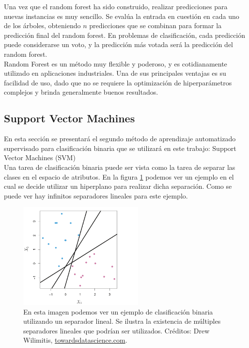 Una vez que el random forest ha sido construido, realizar predicciones para nuevas instancias es muy sencillo. Se evalúa la entrada en cuestión en cada uno de los árboles, obteniendo $n$ predicciones que se combinan para formar la predicción final del random forest. En problemas de clasificación, cada predicción puede considerarse un voto, y la predicción más votada será la predicción del random forest.\\

Random Forest es un método muy flexible y poderoso, y es cotidianamente utilizado en aplicaciones industriales. Una de sus principales ventajas es su facilidad de uso, dado que no se requiere la optimización de hiperparámetros complejos y brinda generalmente buenos resultados.

\subsection{Support Vector Machines}

\label{trick}

En esta sección se presentará el segundo método de aprendizaje automatizado supervisado para clasificación binaria que se utilizará en este trabajo: Support Vector Machines (SVM) \cite{svm2} \cite{svm}  \\

Una tarea de clasificación binaria puede ser vista como la tarea de separar las clases en el espacio de atributos. En la figura \ref{fig:sv1} podemos ver un ejemplo en el cual se decide utilizar un hiperplano para realizar dicha separación. Como se puede ver hay infinitos separadores lineales para este ejemplo. \\

\begin{figure}[h!]
\begin{center}
  \includegraphics[width=0.56\textwidth]{Kap1/svm1.png} 
\end{center}
\caption{ En esta imagen podemos ver un ejemplo de clasificación binaria utilizando un separador lineal. Se ilustra la existencia de múltiples separadores lineales que podrían ser utilizados. Créditos: Drew Wilimitis, \url{towardsdatascience.com}.}
\label{fig:sv1}
\end{figure}

